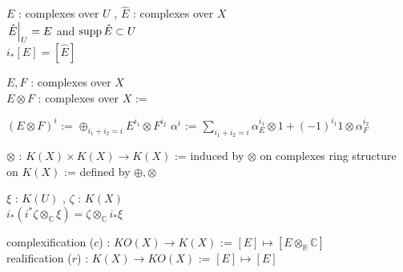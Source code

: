 \begin{Theorem}
\itemprop
  \For \(E\) : complexes over \(U\) , \(\hat{E}\) : complexes over \(X\) \\
  \IfHold \(\left. {\hat{E}} \right| _{U} = E\) and \(\text{supp} \, {\hat{E}} \subset U\) \\
  \Then \(i_* [E] = [\hat{E}]\)
\end{Theorem}

\begin{Definition}[複体のテンソルと環構造]
\itemdefi
  \For \(E,F\) : complexes over \(X\) \\
  \Define \(E \otimes F\) : complexes over \(X\) :=
  \begin{itemize}
    \itemenum \((E \otimes F)^i\) := \(\oplus_{i_1 + i_2 = i} E^{i_1} \otimes F^{i_2}\)
    \itemenum \(\alpha^i\) := \(\sum_{i_1 + i_2 = i} \alpha_E^{i_1} \otimes 1 + (-1)^{i_1} 1 \otimes \alpha_F^{i_2}\)
  \end{itemize}
\itemdefi
  \Define \(\otimes\) : \(K(X) \times K(X) \to K(X)\) := induced by \(\otimes\) on complexes
\itemdefi
  \Define ring structure on \(K(X)\) := defined by \(\oplus,\otimes\)
\end{Definition}

\begin{Theorem}[(1) の式]
\itemprop
  \For \(\xi\) : \(K(U)\) , \(\zeta\) : \(K(X)\) \\
  \Then \(i_*(i^* \zeta \otimes_{\mathbb{C}} \xi) = \zeta \otimes_{\mathbb{C}} i_* \xi\)
\end{Theorem}

\begin{Definition}
\itemdefi
  complexification (\(c\)) : \(KO(X) \to K(X)\) := \([E] \mapsto [E \otimes_{\mathbb{R}} \mathbb{C}]\) \\
  realification (\(r\)) : \(K(X) \to KO(X)\) := \([E] \mapsto [E]\)
\end{Definition}